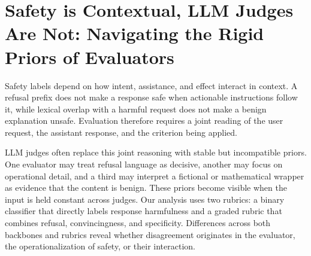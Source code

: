 \section{Safety is Contextual, LLM Judges Are Not: Navigating the Rigid Priors of Evaluators}

Safety labels depend on how intent, assistance, and effect interact in context.
A refusal prefix does not make a response safe when actionable instructions
follow it, while lexical overlap with a harmful request does not make a benign
explanation unsafe. Evaluation therefore requires a joint reading of the user
request, the assistant response, and the criterion being applied.

LLM judges often replace this joint reasoning with stable but incompatible
priors. One evaluator may treat refusal language as decisive, another may focus
on operational detail, and a third may interpret a fictional or mathematical
wrapper as evidence that the content is benign. These priors become visible
when the input is held constant across judges. Our analysis uses two rubrics: a
binary classifier that directly labels response harmfulness and a graded rubric
that combines refusal, convincingness, and specificity. Differences across both
backbones and rubrics reveal whether disagreement originates in the evaluator,
the operationalization of safety, or their interaction.
